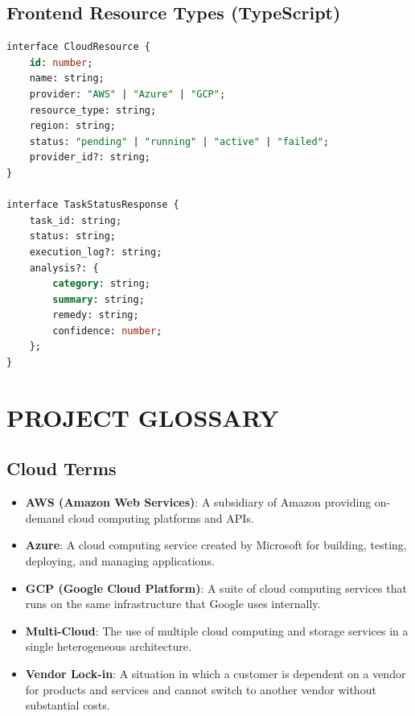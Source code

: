 \section{Frontend Resource Types (TypeScript)}
\begin{lstlisting}[language=SQL]
interface CloudResource {
    id: number;
    name: string;
    provider: "AWS" | "Azure" | "GCP";
    resource_type: string;
    region: string;
    status: "pending" | "running" | "active" | "failed";
    provider_id?: string;
}

interface TaskStatusResponse {
    task_id: string;
    status: string;
    execution_log?: string;
    analysis?: {
        category: string;
        summary: string;
        remedy: string;
        confidence: number;
    };
}
\end{lstlisting}

\newpage
\chapter{PROJECT GLOSSARY}

\section{Cloud Terms}
\begin{itemize}
    \item \textbf{AWS (Amazon Web Services)}: A subsidiary of Amazon providing on-demand cloud computing platforms and APIs.
    \item \textbf{Azure}: A cloud computing service created by Microsoft for building, testing, deploying, and managing applications.
    \item \textbf{GCP (Google Cloud Platform)}: A suite of cloud computing services that runs on the same infrastructure that Google uses internally.
    \item \textbf{Multi-Cloud}: The use of multiple cloud computing and storage services in a single heterogeneous architecture.
    \item \textbf{Vendor Lock-in}: A situation in which a customer is dependent on a vendor for products and services and cannot switch to another vendor without substantial costs.
\end{itemize}


